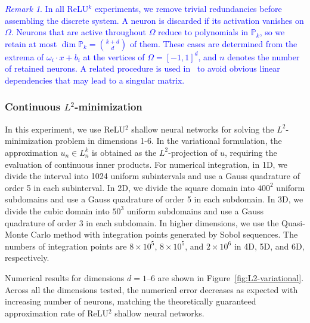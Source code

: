 \documentclass{article}
\theoremstyle{remark}
\newtheorem{remark}{Remark}
\begin{document}
\textcolor{blue}{
\begin{remark}
In all ReLU$^k$ experiments, we remove trivial redundancies before assembling the discrete system. A neuron is discarded if its activation vanishes on $\Omega$. Neurons that are active throughout $\Omega$
reduce to polynomials in $\mathbb{P}_k$, so we retain at most $\dim\mathbb{P}_k=\binom{k+d}{d}$ of them. 
These cases are determined
from the extrema of $\omega_i\cdot x+b_i$ at the vertices of $\Omega=[-1,1]^d$, and $n$ denotes the number of retained neurons.
A related procedure is used in~\cite{PXX:2022} to avoid obvious linear
dependencies that may lead to a singular matrix.
\end{remark}
} 
 

\subsubsection{Continuous $L^2$-minimization}
In this experiment, we use ReLU$^2$ shallow neural networks for solving the $L^2$-minimization problem in dimensions 1-6. 
In the variational formulation, the approximation $u_n \in L_n^k$ is obtained 
as the $L^2$-projection of $u$, requiring the evaluation of continuous inner products. 
For numerical integration, in 1D, we divide the interval into 1024 uniform subintervals and use a Gauss quadrature of order 5 in each subinterval.
In 2D, we divide the square domain into $400^2$ uniform subdomains and use a Gauss quadrature of order 5 in each subdomain.
In 3D, we divide the cubic domain into $50^3$ uniform subdomains and use a Gauss quadrature of order 3 in each subdomain.
In higher dimensions, we use the Quasi-Monte Carlo method with integration points generated by Sobol sequences.
The numbers of integration points are $8\times10^5$, $8\times10^5$, and $2\times10^6$ in 4D, 5D, and 6D, respectively.

Numerical results for dimensions $d=1$--$6$ are shown in 
Figure~\ref{fig:L2-variational}.  
Across all the dimensions tested, the numerical error decreases as expected with 
increasing number of neurons, matching the theoretically guaranteed approximation rate of ReLU$^2$ shallow neural networks. 


\end{document}
